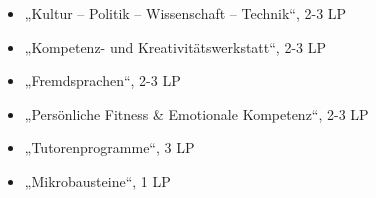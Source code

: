 \begin{course}
\begin{content}
 \begin{itemize}\item „Kultur – Politik – Wissenschaft – Technik“, 2-3 LP  \item „Kompetenz- und Kreativitätswerkstatt“, 2-3 LP   \item „Fremdsprachen“, 2-3 LP  \item „Persönliche Fitness \& Emotionale Kompetenz“, 2-3 LP  \item „Tutorenprogramme“, 3 LP  \item „Mikrobausteine“, 1 LP  \end{itemize}
\end{content}







\end{course}